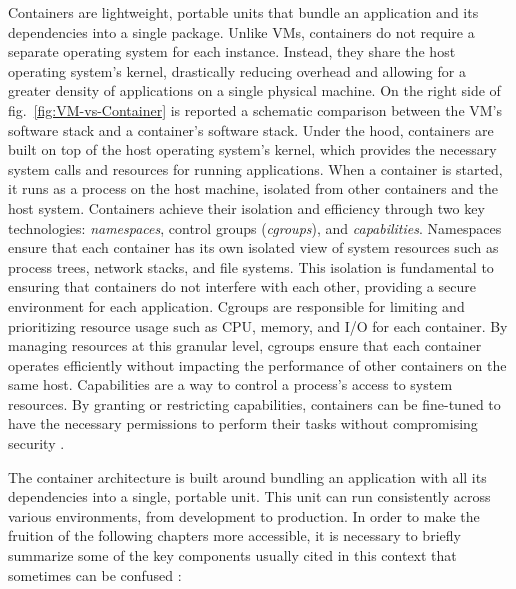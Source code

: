 Containers are lightweight, portable units that bundle an application and its
dependencies into a single package. Unlike VMs, containers do not require a
separate operating system for each instance. Instead, they share the host
operating system's kernel, drastically reducing overhead and allowing for a
greater density of applications on a single physical machine. On the right side
of fig.~\ref{fig:VM-vs-Container} is reported a schematic comparison between the
VM's software stack and a container's software stack. Under the hood, containers
are built on top of the host operating system's kernel, which provides the
necessary system calls and resources for running applications. When a container
is started, it runs as a process on the host machine, isolated from other
containers and the host system. Containers achieve their isolation and
efficiency through two key technologies: \textit{namespaces}, control groups
(\textit{cgroups}), and \textit{capabilities}. Namespaces ensure that each
container has its own isolated view of system resources such as process trees,
network stacks, and file systems. This isolation is fundamental to ensuring that
containers do not interfere with each other, providing a secure environment for
each application. Cgroups are responsible for limiting and prioritizing resource
usage such as CPU, memory, and I/O for each container. By managing resources at
this granular level, cgroups ensure that each container operates efficiently
without impacting the performance of other containers on the same host.
Capabilities are a way to control a process's access to system resources. By
granting or restricting capabilities, containers can be fine-tuned to have the
necessary permissions to perform their tasks without compromising security
\cite{kerris2021}.

The container architecture is built around bundling an application with all its
dependencies into a single, portable unit. This unit can run consistently across
various environments, from development to production.
In order to make the fruition of the following chapters more accessible, it is
necessary to briefly summarize some of the key components usually cited in this
context that sometimes can be confused \cite{walsh2022, huawei2023}:

